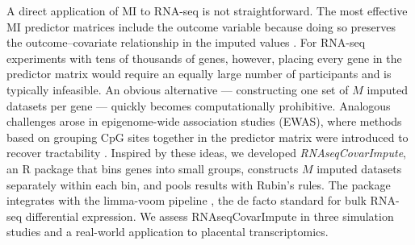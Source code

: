 \documentclass[11pt]{article}
\begin{document}
A direct application of MI to RNA-seq is not straightforward. The most effective MI predictor matrices include the outcome variable because doing so preserves the outcome--covariate relationship in the imputed values \citep{vanbuuren2011mice}. For RNA-seq experiments with tens of thousands of genes, however, placing every gene in the predictor matrix would require an equally large number of participants and is typically infeasible. An obvious alternative --- constructing one set of $M$ imputed datasets per gene --- quickly becomes computationally prohibitive. Analogous challenges arose in epigenome-wide association studies (EWAS), where methods based on grouping CpG sites together in the predictor matrix were introduced to recover tractability \citep{mill2013epigenomewide,weinhold2020statistical}. Inspired by these ideas, we developed \emph{RNAseqCovarImpute}, an R package that bins genes into small groups, constructs $M$ imputed datasets separately within each bin, and pools results with Rubin's rules. The package integrates with the limma-voom pipeline \citep{law2014voom,ritchie2015limma}, the de facto standard for bulk RNA-seq differential expression. We assess RNAseqCovarImpute in three simulation studies and a real-world application to placental transcriptomics.
\end{document}
